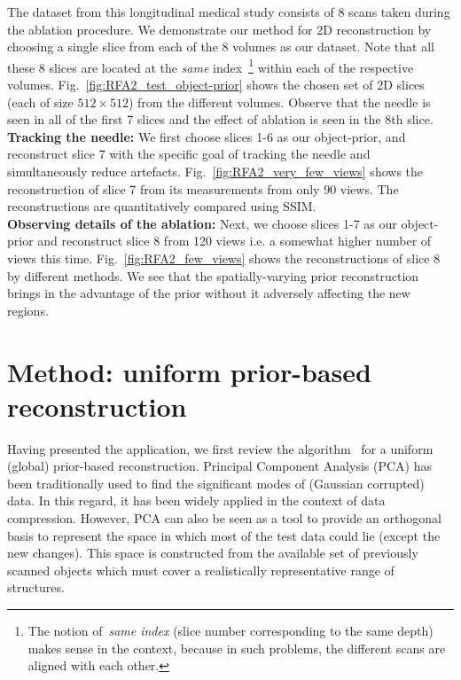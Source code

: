 \documentclass[journal]{IEEEtran}
\begin{document}
The dataset from this longitudinal medical study consists of 8 scans
taken during the ablation procedure. We demonstrate our method for 2D
reconstruction by choosing a single slice from each of the 8 volumes
as our dataset. Note that all these 8 slices are located at the
\emph{same} index~\footnote{The notion of~\textit{same index} (slice
  number corresponding to the same depth) makes sense in the context,
  because in such problems, the different scans are aligned with each
  other.} within each of the respective
volumes. Fig.~\ref{fig:RFA2_test_object-prior} shows the chosen set of
2D slices (each of size $512 \times 512$) from the different
volumes. Observe that the needle is seen in all of the first 7 slices
and the effect of ablation is seen in the 8th slice. \\

\textbf{Tracking the needle:} We first choose slices 1-6 as our
object-prior, and reconstruct slice 7 with the specific goal of
tracking the needle and simultaneously reduce
artefacts. Fig.~\ref{fig:RFA2_very_few_views} shows the reconstruction
of slice 7 from its measurements from only 90 views. The
reconstructions are quantitatively compared using SSIM.\\

\textbf{Observing details of the ablation:} Next, we choose slices 1-7 as our object-prior and reconstruct slice 8 from 120 views i.e. a somewhat higher number of views this time. Fig.~\ref{fig:RFA2_few_views} shows the reconstructions of slice 8 by different methods. We see that the spatially-varying prior reconstruction brings in the advantage of the prior without it adversely affecting the new regions.

\section{Method: uniform prior-based reconstruction}
\label{sec:method_uniform_prior}
Having presented the application, we first review the algorithm~\cite{my_dicta_paper} for a uniform (global) prior-based reconstruction. Principal Component Analysis (PCA) has been traditionally used to find the significant modes of (Gaussian corrupted) data. In this regard, it has been widely applied in the context of data compression. However, PCA can also be seen as a tool to provide an orthogonal basis to represent the space in which most of the test data could lie (except the new changes). This space is constructed from the available set of previously scanned objects which must cover a realistically representative range of structures. %
\end{document}
